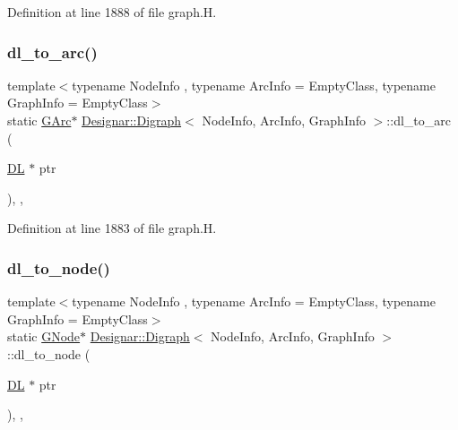 Definition at line 1888 of file graph.\+H.

\mbox{\label{class_designar_1_1_digraph_af9581e9d0825da11ce153bd055149f7f}} 
\subsubsection{\texorpdfstring{dl\+\_\+to\+\_\+arc()}{dl\_to\_arc()}}
{\footnotesize\ttfamily template$<$typename Node\+Info , typename Arc\+Info  = Empty\+Class, typename Graph\+Info  = Empty\+Class$>$ \\
static \hyperlink{class_designar_1_1_digraph_a341acf8fb0195a8986158c29c4db1a89}{G\+Arc}$\ast$ \hyperlink{class_designar_1_1_digraph}{Designar\+::\+Digraph}$<$ Node\+Info, Arc\+Info, Graph\+Info $>$\+::dl\+\_\+to\+\_\+arc (\begin{DoxyParamCaption}\item[{\hyperlink{class_designar_1_1_d_l}{DL} $\ast$}]{ptr }\end{DoxyParamCaption})\hspace{0.3cm}{\ttfamily [inline]}, {\ttfamily [static]}, {\ttfamily [protected]}}



Definition at line 1883 of file graph.\+H.

\mbox{\label{class_designar_1_1_digraph_adbb91274c17d6087fdd5721e3f9b1f7c}} 
\subsubsection{\texorpdfstring{dl\+\_\+to\+\_\+node()}{dl\_to\_node()}}
{\footnotesize\ttfamily template$<$typename Node\+Info , typename Arc\+Info  = Empty\+Class, typename Graph\+Info  = Empty\+Class$>$ \\
static \hyperlink{class_designar_1_1_digraph_a33b0d2b8820ada501522b0e67e63524a}{G\+Node}$\ast$ \hyperlink{class_designar_1_1_digraph}{Designar\+::\+Digraph}$<$ Node\+Info, Arc\+Info, Graph\+Info $>$\+::dl\+\_\+to\+\_\+node (\begin{DoxyParamCaption}\item[{\hyperlink{class_designar_1_1_d_l}{DL} $\ast$}]{ptr }\end{DoxyParamCaption})\hspace{0.3cm}{\ttfamily [inline]}, {\ttfamily [static]}, {\ttfamily [protected]}}



